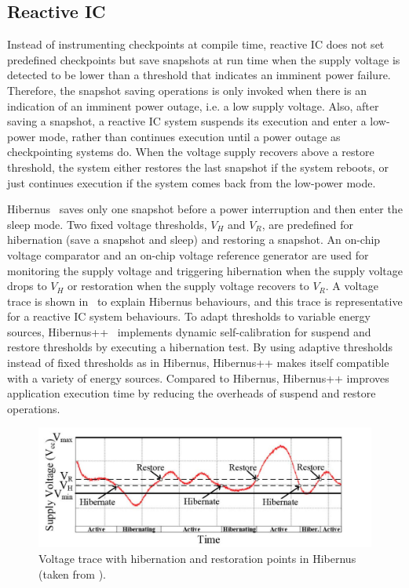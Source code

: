 \subsection{Reactive IC} \label{Section:reactiveic}

Instead of instrumenting checkpoints at compile time, reactive IC does not set predefined checkpoints but save snapshots at run time when the supply voltage is detected to be lower than a threshold that indicates an imminent power failure. Therefore, the snapshot saving operations is only invoked when there is an indication of an imminent power outage, i.e. a low supply voltage. Also, after saving a snapshot, a reactive IC system suspends its execution and enter a low-power mode, rather than continues execution until a power outage as checkpointing systems do. When the voltage supply recovers above a restore threshold, the system either restores the last snapshot if the system reboots, or just continues execution if the system comes back from the low-power mode.

Hibernus~\cite{balsamo2015hibernus} saves only one snapshot before a power interruption and then enter the sleep mode. Two fixed voltage thresholds, $V_H$ and $V_R$, are predefined for hibernation (save a snapshot and sleep) and restoring a snapshot. An on-chip voltage comparator and an on-chip voltage reference generator are used for monitoring the supply voltage and triggering hibernation when the supply voltage drops to $V_H$ or restoration when the supply voltage recovers to $V_R$. A voltage trace is shown in~ to explain Hibernus behaviours, and this trace is representative for a reactive IC system behaviours. To adapt thresholds to variable energy sources, Hibernus++~\cite{balsamo2016hibernus++} implements dynamic self-calibration for suspend and restore thresholds by executing a hibernation test. By using adaptive thresholds instead of fixed thresholds as in Hibernus, Hibernus++ makes itself compatible with a variety of energy sources. Compared to Hibernus, Hibernus++ improves application execution time by reducing the overheads of suspend and restore operations.

\begin{figure}
    \centering
    \includegraphics[width=\columnwidth]{ch2_review/figures/hibernus}
    \caption{Voltage trace with hibernation and restoration points in Hibernus (taken from \cite{balsamo2015hibernus}).}
    \label{Figure:hibernus}
\end{figure}

